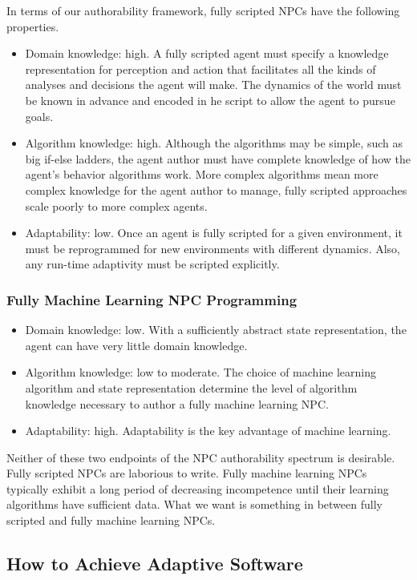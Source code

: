 In terms of our authorability framework, fully scripted NPCs have the
following properties.
\begin{itemize}
\item Domain knowledge: high. A fully scripted agent must specify a knowledge representation for perception and action that facilitates all the kinds of analyses and decisions the agent will make.  The dynamics of the world must be known in advance and encoded in he script to allow the agent to pursue goals.
\item Algorithm knowledge: high.  Although the algorithms may be simple, such as big if-else ladders, the agent author must have complete knowledge of how the agent's behavior algorithms work.  More complex algorithms mean more complex knowledge for the agent author to manage, fully scripted approaches scale poorly to more complex agents.
\item Adaptability: low.  Once an agent is fully scripted for a given environment, it must be reprogrammed for new environments with different dynamics.  Also, any run-time adaptivity must be scripted explicitly.
\end{itemize}

\subsubsection{Fully Machine Learning NPC Programming}

\begin{itemize}
\item Domain knowledge: low. With a sufficiently abstract state
  representation, the agent can have very little domain knowledge.
\item Algorithm knowledge: low to moderate.  The choice of machine
  learning algorithm and state representation determine the level of
  algorithm knowledge necessary to author a fully machine learning
  NPC.
\item Adaptability: high.  Adaptability is the key advantage of
  machine learning.
\end{itemize}

Neither of these two endpoints of the NPC authorability spectrum is desirable.  Fully scripted NPCs are laborious to write.  Fully machine learning NPCs typically exhibit a long period of decreasing incompetence until their learning algorithms have sufficient data.  What we want is something in between fully scripted and fully machine learning NPCs.

\subsection{How to Achieve Adaptive Software}


